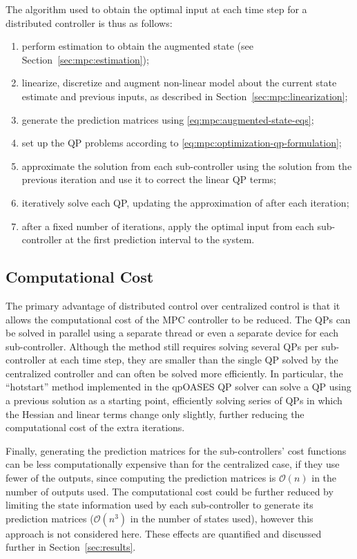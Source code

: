 The algorithm used to obtain the optimal input at each time step for a distributed controller is thus as follows:

\begin{enumerate}
  \item perform estimation to obtain the augmented state (see Section~\ref{sec:mpc:estimation});
  \item linearize, discretize and augment non-linear model about the current state estimate and previous inputs, as described in Section~\ref{sec:mpc:linearization};
  \item generate the prediction matrices using \eqref{eq:mpc:augmented-state-eqs};
  \item set up the QP problems according to \eqref{eq:mpc:optimization-qp-formulation};
  \item approximate the solution from each sub-controller using the solution from the previous iteration and use it to correct the linear QP terms;
  \item iteratively solve each QP, updating the approximation of   after each iteration;
  \item after a fixed number of iterations, apply the optimal input from each sub-controller at the first prediction interval to the system.
\end{enumerate}

\subsection{Computational Cost}

The primary advantage of distributed control over centralized control is that it allows the computational cost of the MPC controller to be reduced.
The QPs can be solved in parallel using a separate thread or even a separate device for each sub-controller.
Although the method still requires solving several QPs per sub-controller at each time step, they are smaller than the single QP solved by the centralized controller and can often be solved more efficiently.
In particular, the ``hotstart'' method implemented in the qpOASES QP solver can solve a QP using a previous solution as a starting point, efficiently solving series of QPs in which the Hessian and linear terms change only slightly, further reducing the computational cost of the extra iterations.

Finally, generating the prediction matrices for the sub-controllers' cost functions can be less computationally expensive than for the centralized case, if they use fewer of the outputs, since computing the prediction matrices is $\mathcal{O}(n)$ in the number of outputs used.
The computational cost could be further reduced by limiting the state information used by each sub-controller to generate its prediction matrices ($\mathcal{O}(n^3)$ in the number of states used), however this approach is not considered here.
These effects are quantified and discussed further in Section~\ref{sec:results}.

